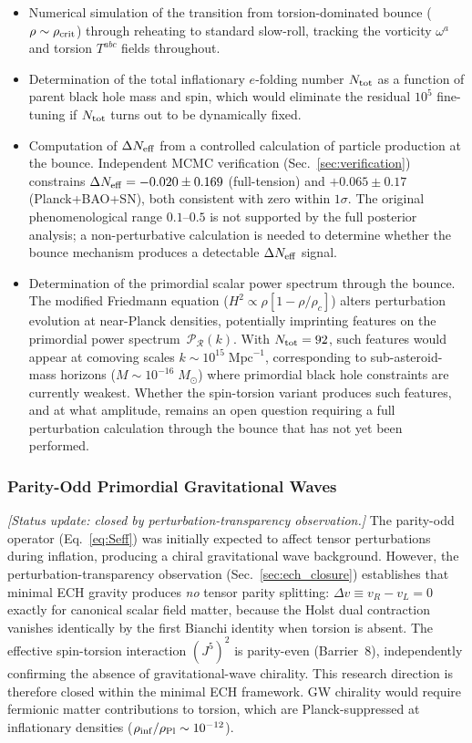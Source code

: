 \documentclass[aps,prd,twocolumn,superscriptaddress,showpacs,preprintnumbers,nofootinbib,longbibliography,floatfix]{revtex4-2}
\newcommand{\rhocrit}{\rho_{\rm crit}}
\newcommand{\Neff}{N_{\rm eff}}
\begin{document}
\begin{itemize}[leftmargin=*]
\item Numerical simulation of the transition from torsion-dominated bounce ($\rho\sim\rhocrit$) through reheating to standard slow-roll, tracking the vorticity $\omega^a$ and torsion $T^{abc}$ fields throughout.
\item Determination of the total inflationary $e$-folding number $N_{\rm tot}$ as a function of parent black hole mass and spin, which would eliminate the residual $10^5$ fine-tuning if $N_{\rm tot}$ turns out to be dynamically fixed.
\item Computation of $\Delta\Neff$ from a controlled calculation of particle production at the bounce. Independent MCMC verification (Sec.~\ref{sec:verification}) constrains $\Delta\Neff = -0.020 \pm 0.169$ (full-tension) and $+0.065 \pm 0.17$ (Planck+BAO+SN), both consistent with zero within $1\sigma$. The original phenomenological range $0.1$--$0.5$ is not supported by the full posterior analysis; a non-perturbative calculation is needed to determine whether the bounce mechanism produces a detectable $\Delta\Neff$ signal.
\item Determination of the primordial scalar power spectrum through the bounce. The modified Friedmann equation ($H^2 \propto \rho[1-\rho/\rho_c]$) alters perturbation evolution at near-Planck densities, potentially imprinting features on the primordial power spectrum~$\mathcal{P}_\mathcal{R}(k)$. With $N_{\rm tot} = 92$, such features would appear at comoving scales $k \sim 10^{15}\;\text{Mpc}^{-1}$, corresponding to sub-asteroid-mass horizons ($M \sim 10^{-16}\;M_\odot$) where primordial black hole constraints are currently weakest. Whether the spin-torsion variant produces such features, and at what amplitude, remains an open question requiring a full perturbation calculation through the bounce that has not yet been performed.
\end{itemize}

\subsubsection{Parity-Odd Primordial Gravitational Waves}

\textit{[Status update: closed by perturbation-transparency observation.]} The parity-odd operator (Eq.~\ref{eq:Seff}) was initially expected to affect tensor perturbations during inflation, producing a chiral gravitational wave background. However, the perturbation-transparency observation (Sec.~\ref{sec:ech_closure}) establishes that minimal ECH gravity produces \emph{no} tensor parity splitting: $\Delta v \equiv v_R - v_L = 0$ exactly for canonical scalar field matter, because the Holst dual contraction vanishes identically by the first Bianchi identity when torsion is absent. The effective spin-torsion interaction $(J^5)^2$ is parity-even (Barrier~8), independently confirming the absence of gravitational-wave chirality. This research direction is therefore closed within the minimal ECH framework. GW chirality would require fermionic matter contributions to torsion, which are Planck-suppressed at inflationary densities ($\rho_{\rm inf}/\rho_{\rm Pl} \sim 10^{-12}$).
\end{document}
